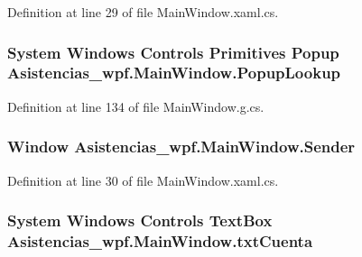 Definition at line 29 of file Main\-Window.\-xaml.\-cs.

\hypertarget{class_asistencias__wpf_1_1_main_window_ab76400422a21298f8055dd60e6d922c7}{
\subsubsection[{Popup\-Lookup}]{\setlength{\rightskip}{0pt plus 5cm}System Windows Controls Primitives Popup Asistencias\-\_\-wpf.\-Main\-Window.\-Popup\-Lookup\hspace{0.3cm}{\ttfamily [package]}}}\label{class_asistencias__wpf_1_1_main_window_ab76400422a21298f8055dd60e6d922c7}


Definition at line 134 of file Main\-Window.\-g.\-cs.

\hypertarget{class_asistencias__wpf_1_1_main_window_a4e35f0ebc45164d603bcc80544bc2bc1}{
\subsubsection[{Sender}]{\setlength{\rightskip}{0pt plus 5cm}Window Asistencias\-\_\-wpf.\-Main\-Window.\-Sender\hspace{0.3cm}{\ttfamily [private]}}}\label{class_asistencias__wpf_1_1_main_window_a4e35f0ebc45164d603bcc80544bc2bc1}


Definition at line 30 of file Main\-Window.\-xaml.\-cs.

\hypertarget{class_asistencias__wpf_1_1_main_window_a52e76fc15be974c00138b13ab7e19b44}{
\subsubsection[{txt\-Cuenta}]{\setlength{\rightskip}{0pt plus 5cm}System Windows Controls Text\-Box Asistencias\-\_\-wpf.\-Main\-Window.\-txt\-Cuenta\hspace{0.3cm}{\ttfamily [package]}}}\label{class_asistencias__wpf_1_1_main_window_a52e76fc15be974c00138b13ab7e19b44}



